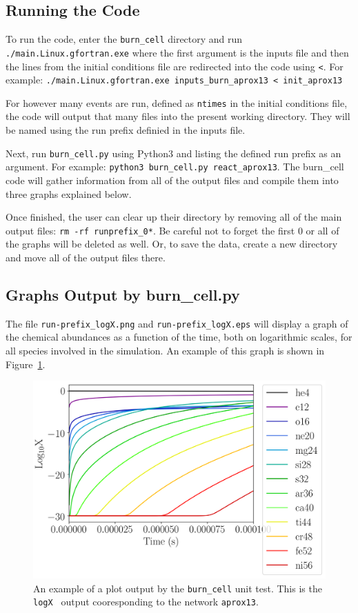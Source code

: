 \subsection{Running the Code}

To run the code, enter the {\tt burn\_cell} directory and run {\tt ./main.Linux.gfortran.exe} where the first argument is the inputs file and then the lines from the initial conditions file are redirected into the code using {\tt <}. 
For example: {\tt ./main.Linux.gfortran.exe inputs\_burn\_aprox13 < init\_aprox13}

For however many events are run, defined as { \tt ntimes} in the initial conditions file, the code will output that many files into the present working directory. 
They will be named using the run prefix definied in the inputs file.

Next, run {\tt burn\_cell.py} using Python3 and listing the defined run prefix as an argument.
For example: {\tt python3 burn\_cell.py react\_aprox13}. 
The burn\_cell code will gather information from all of the output files and compile them into three graphs explained below.

Once finished, the user can clear up their directory by removing all of the main output files: {\tt rm -rf runprefix\_0*}. 
Be careful not to forget the first 0 or all of the graphs will be deleted as well. 
Or, to save the data, create a new directory and move all of the output files there. 

\subsection{Graphs Output by burn\_cell.py}

The file {\tt run-prefix\_logX.png} and {\tt run-prefix\_logX.eps} will display a graph of the chemical abundances as a function of the time, both on logarithmic scales, for all species involved in the simulation. 
An example of this graph is shown in Figure~\ref{fig:aprox13_logX}.

\begin{figure}
        \centering
	\includegraphics[width=4.5in]{react_aprox13_logX}
	\caption{An example of a plot output by the {\tt burn\_cell} unit test. This is the { \tt logX } output cooresponding to the network { \tt aprox13}.}
	\label{fig:aprox13_logX}
\end{figure}

